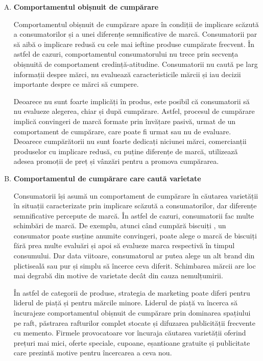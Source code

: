 \documentclass[a4paper, 12pt]{article}
\begin{document}
\begin{enumerate}[A)]
				\item \textbf{Comportamentul obișnuit de cumpărare}
				
				\quad Comportamentul obișnuit de cumpărare apare în condiții de implicare scăzută a consumatorilor și a unei diferențe semnificative de marcă. Consumatorii par să aibă o implicare redusă cu cele mai ieftine produse cumpărate frecvent. În astfel de cazuri, comportamentul consumatorului nu trece prin secvența obișnuită de comportament credință-atitudine. Consumatorii nu caută pe larg informații despre mărci, nu evaluează caracteristicile mărcii și iau decizii importante despre ce mărci să cumpere.
				
				\quad Deoarece nu sunt foarte implicăți în produs, este posibil că consumatorii să nu evalueze alegerea, chiar și după cumpărare. Astfel, procesul de cumpărare implică convingeri de marcă formate prin învățare pasivă, urmat de un comportament de cumpărare, care poate fi urmat sau nu de evaluare. Deoarece cumpărătorii nu sunt foarte dedicați niciunei mărci, comercianții produselor cu implicare redusă, cu puține diferențe de marcă, utilizează adesea promoții de preț și vânzări pentru a promova cumpărarea.
				
				\item \textbf{Comportamentul de cumpărare care caută varietate}
				
				\quad Consumatorii își asumă un comportament de cumpărare în căutarea varietății în situații caracterizate prin implicare scăzută a consumatorilor, dar diferențe semnificative percepute de marcă. În astfel de cazuri, consumatorii fac multe schimbări de marcă. De exemplu, atunci când cumpără biscuiți , un consumator poate susține anumite convingeri, poate alege o marcă de biscuiți fără prea multe evaluări și apoi să evalueze marca respectivă în timpul consumului. Dar data viitoare, consumatorul ar putea alege un alt brand din plictiseală sau pur și simplu să încerce ceva diferit. Schimbarea mărcii are loc mai degrabă din motive de varietate decât din cauza nemulțumirii.
				
				\quad În astfel de categorii de produse, strategia de marketing poate diferi pentru liderul de piață și pentru mărcile minore. Liderul de piață va încerca să încurajeze comportamentul obișnuit de cumpărare prin dominarea spațiului pe raft, păstrarea rafturilor complet stocate și difuzarea publicității frecvente cu memento. Firmele provocatoare vor încuraja căutarea varietății oferind prețuri mai mici, oferte speciale, cupoane, eșantioane gratuite și publicitate care prezintă motive pentru încercarea a ceva nou.
			\end{enumerate}
			
\end{document}
